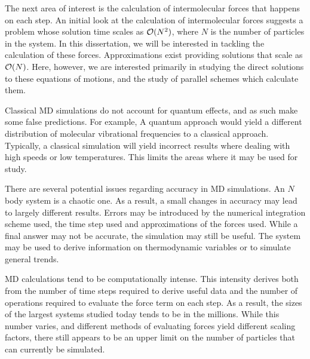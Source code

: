 The next area of interest is
the calculation of intermolecular forces that happens on each step.
%
An initial look at the calculation of intermolecular forces suggests
a problem whose solution time scales as $\mathcal{O}{(N^2)}$,
where $N$ is the number of particles in the system.
%
In this dissertation, we will be interested in
tackling the calculation of these forces.
%
Approximations exist providing solutions that scale as $\mathcal{O}{(N)}$.
%
Here, however, we are interested primarily in
studying the direct solutions to these equations of motions,
and the study of parallel schemes which calculate them.

Classical MD simulations do not account for quantum effects,
and as such make some false predictions.
%
For example, A quantum approach would yield
a different distribution of
molecular vibrational frequencies to a classical approach.
%
Typically, a classical simulation will yield incorrect results
where dealing with high speeds or low temperatures.
%
This limits the areas where it may be used for study.

There are several potential issues regarding accuracy in MD simulations.
%
An $N$ body system is a chaotic one.
%
As a result, a small changes in accuracy may lead to
largely different results.
%
Errors may be introduced by
the numerical integration scheme used,
the time step used and
approximations of the forces used.
%
While a final answer may not be accurate,
the simulation may still be useful.
%
The system may be used to derive information on
thermodynamic variables or to simulate general trends.


MD calculations tend to be computationally intense.
%
This intensity derives both from
the number of time steps required to derive useful data and
the number of operations required to evaluate the force term on each step.
%
As a result, the sizes of the largest systems studied today
tends to be in the millions.
%
While this number varies,
and different methods of evaluating forces yield
different scaling factors,
there still appears to be an upper limit on
the number of particles that can currently be simulated.
